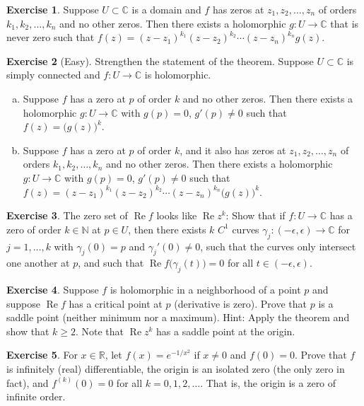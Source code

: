 \documentclass[12pt,openany]{book}
\renewcommand{\Re}{\operatorname{Re}}
\newcommand{\C}{{\mathbb{C}}}
\newcommand{\R}{{\mathbb{R}}}
\newcommand{\N}{{\mathbb{N}}}
\theoremstyle{plain}
\theoremstyle{remark}
\theoremstyle{definition}
\newenvironment{exbox}{%
    \def\FrameCommand{\vrule width 1pt \relax\hspace{10pt}}%
    \MakeFramed{\advance\hsize-\width\FrameRestore}%
}{%
    \endMakeFramed
}
\newenvironment{exparts}{%
    \leavevmode\begin{enumerate}[a),noitemsep,topsep=0pt,parsep=0pt,partopsep=0pt]
}{%
    \end{enumerate}
}
\theoremstyle{exercise}
\newtheorem{exercise}{Exercise}[section]
\theoremstyle{example}
\begin{document}
\begin{exbox}
\begin{exercise}
Suppose $U \subset \C$ is a domain and $f$ 
has zeros at $z_1, z_2, \ldots, z_n$ of
orders $k_1, k_2, \ldots, k_n$ and no other zeros.
Then there exists a holomorphic
$g \colon U \to \C$ that is never zero
such that $f(z) = {(z-z_1)}^{k_1}{(z-z_2)}^{k_2}\cdots{(z-z_n)}^{k_n} g(z).$
\end{exercise}

\begin{exercise}[Easy]
Strengthen the statement of the theorem.
Suppose $U \subset \C$ is simply connected and $f \colon U \to \C$
is holomorphic.
\begin{exparts}
\item
Suppose $f$ has a zero at $p$ of
order $k$ and no other zeros.
Then there exists a holomorphic
$g \colon U \to \C$ with $g(p) = 0$, $g'(p) \not= 0$
such that $f(z) = {\bigl( g(z) \bigr)}^k$.
\item
Suppose $f$ has a zero at $p$
of order $k$,
and it also has zeros at $z_1, z_2, \ldots, z_n$ of
orders $k_1, k_2, \ldots, k_n$ and no other zeros.
Then there exists a holomorphic
$g \colon U \to \C$ with $g(p) = 0$, $g'(p) \not= 0$
such that $f(z) = {(z-z_1)}^{k_1}{(z-z_2)}^{k_2}\cdots{(z-z_n)}^{k_n} {\bigl( g(z) \bigr)}^k$.
\end{exparts}
\end{exercise}

\begin{exercise}
The zero set of $\Re f$ looks like $\Re z^k$:
Show that if $f \colon U \to \C$ has a zero of order $k \in \N$ at $p \in
U$, then there exists $k$  $C^1$ curves
$\gamma_j \colon (-\epsilon, \epsilon) \to \C$ for
$j=1,\ldots,k$ with $\gamma_j(0) = p$
and $\gamma_j'(0) \not= 0$, such that the curves only intersect
one another
at $p$, and such that $\Re f\bigl( \gamma_j(t) \bigr) = 0$ for
all $t \in (-\epsilon,\epsilon)$.
\end{exercise}

\begin{exercise}
Suppose $f$ is holomorphic in a neighborhood of a point $p$
and suppose $\Re f$ has a critical point at $p$ (derivative is zero).
Prove that $p$ is a saddle point (neither minimum nor a maximum).
Hint: Apply the theorem and show that $k \geq 2$.  Note that $\Re z^k$ has a
saddle point at the origin.
\end{exercise}

\begin{exercise}
For $x \in \R$, let $f(x) = e^{-1/x^2}$ if $x \not=0$ and $f(0) = 0$.
Prove that $f$ is infinitely (real) differentiable, the origin is
an isolated zero (the only zero in fact), and $f^{(k)}(0) = 0$ for
all $k=0,1,2,\ldots$.  That is, the origin is a zero of infinite order.
\end{exercise}
\end{exbox}
\end{document}
